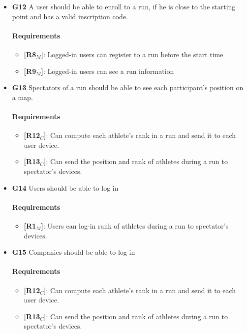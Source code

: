 \begin{itemize}
   
    \item \textbf{G12} A user should be able to enroll to a run, if he is close to the starting point and has a valid inscription code.
    \paragraph{Requirements}
   \begin{itemize}
    \item \textbf{[R8$_M$]}: Logged-in users can register to a run before the start time
    \item \textbf{[R9$_M$]}: Logged-in users can see a run information
   \end{itemize}

   
   
    \item \textbf{G13} Spectators of a run should be able to see each participant's position on a map.
    \paragraph{Requirements}
   \begin{itemize}
    \item \textbf{[R12$_C$]}: Can compute each athlete's rank in a run and send it to each user device.
    \item \textbf{[R13$_C$]}: Can send the position and rank of athletes during a run to spectator's devices.
   \end{itemize}
   
   
    \item \textbf{G14} Users should be able to log in
    \paragraph{Requirements}
   \begin{itemize}
     \item \textbf{[R1$_M$]}: Users can log-in rank of athletes during a run to spectator's devices.
     
   \end{itemize}
   
       \item \textbf{G15} Companies should be able to log in
    \paragraph{Requirements}
   \begin{itemize}
    \item \textbf{[R12$_C$]}: Can compute each athlete's rank in a run and send it to each user device.
    \item \textbf{[R13$_C$]}: Can send the position and rank of athletes during a run to spectator's devices.
   \end{itemize}
   

\end{itemize}

